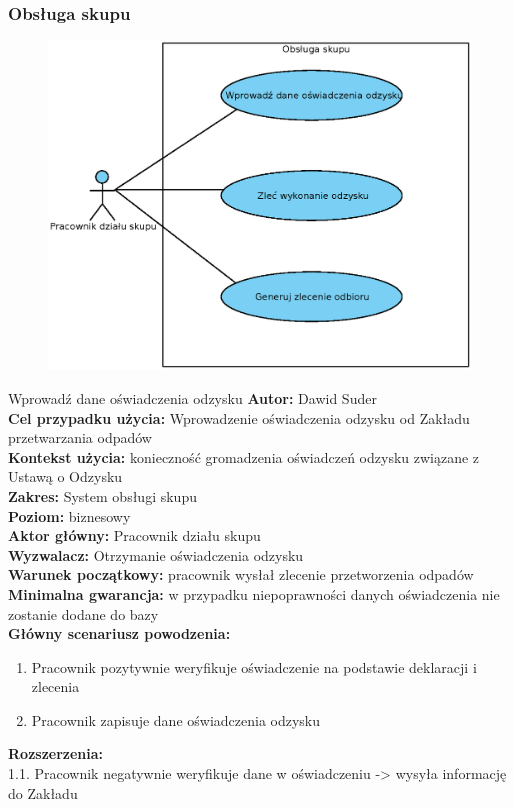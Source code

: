 \subsubsection{Obsługa skupu}

	\begin{figure}[H]
		\centering
		\includegraphics[width=.8\textwidth]{img/UC/skup.eps}
	\end{figure}

	\begin{usecase}{Wprowadź dane oświadczenia odzysku}
	\textbf{Autor:} Dawid Suder \\
	\textbf{Cel przypadku użycia:} Wprowadzenie oświadczenia odzysku od Zakładu przetwarzania odpadów \\
	\textbf{Kontekst użycia:} konieczność gromadzenia oświadczeń odzysku związane z Ustawą o Odzysku \\
	\textbf{Zakres:} System obsługi skupu \\
	\textbf{Poziom:} biznesowy \\
	\textbf{Aktor główny:} Pracownik działu skupu\\
	\textbf{Wyzwalacz:} Otrzymanie oświadczenia odzysku \\
	\textbf{Warunek początkowy:} pracownik wysłał zlecenie przetworzenia odpadów \\
	\textbf{Minimalna gwarancja:} w przypadku niepoprawności danych oświadczenia nie zostanie dodane do bazy \\
	\textbf{Główny scenariusz powodzenia:} \\
		\begin{enumerate}
			\item Pracownik pozytywnie weryfikuje oświadczenie na podstawie deklaracji i zlecenia
			\item Pracownik zapisuje dane oświadczenia odzysku
		\end{enumerate}
	\textbf{Rozszerzenia:} \\
			1.1. Pracownik negatywnie weryfikuje dane w oświadczeniu -> wysyła informację do Zakładu
	\end{usecase}

